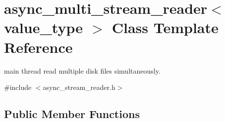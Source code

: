 \hypertarget{classasync__multi__stream__reader}{}\section{async\+\_\+multi\+\_\+stream\+\_\+reader$<$ value\+\_\+type $>$ Class Template Reference}
\label{classasync__multi__stream__reader}


main thread read multiple disk files simultaneously.  




{\ttfamily \#include $<$async\+\_\+stream\+\_\+reader.\+h$>$}

\subsection*{Public Member Functions}
